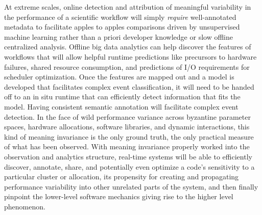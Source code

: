 At extreme scales, online detection and attribution of meaningful
variability in the performance of a scientific workflow will simply
\textit{require} well-annotated metadata to facilitate apples to
apples comparisons driven by unsupervised machine learning rather than
a priori developer knowledge or slow offline centralized analysis.
%
Offline big data analytics can help discover the features of
workflows that will allow helpful runtime predictions like
precursors to hardware failures, shared resource consumption, and
predictions of I/O requirements for scheduler optimization.
%
Once the features are mapped out and a model is developed that
facilitates complex event classification, it will need to be handed
off to an in situ runtime that can efficiently detect information
that fits the model.
%
Having consistent semantic annotation will facilitate complex event
detection.
%
In the face of wild performance variance across byzantine parameter
spaces, hardware allocations, software libraries, and dynamic
interactions, this kind of meaning invariance is the only ground
truth, the only practical measure of what has been observed.
%
With meaning invariance properly worked into the observation and
analytics structure, real-time systems will be able to efficiently
discover, annotate, share, and potentially even optimize a code's
sensitivity to a particular cluster or allocation, its propensity for
creating and propagating performance variability into other unrelated
parts of the system, and then finally pinpoint the lower-level
software mechanics giving rise to the higher level phenomenon.


